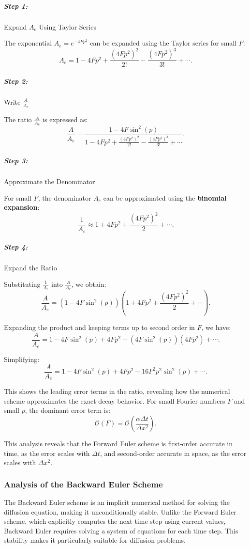 \documentclass{article}
\begin{document}
			\subparagraph{Step 1:} Expand \( A_e \) Using Taylor Series
			
			The exponential \( A_e = e^{-4Fp^2} \) can be expanded using the Taylor series for small \( F \):
			\[
			A_e = 1 - 4Fp^2 + \frac{(4Fp^2)^2}{2!} - \frac{(4Fp^2)^3}{3!} + \cdots.
			\]
			
			\subparagraph{Step 2:} Write \( \frac{A}{A_e} \)
			
			The ratio \( \frac{A}{A_e} \) is expressed as:
			\[
			\frac{A}{A_e} = \frac{1 - 4F\sin^2(p)}{1 - 4Fp^2 + \frac{(4Fp^2)^2}{2!} - \frac{(4Fp^2)^3}{3!} + \cdots}.
			\]
			
			\subparagraph{Step 3:} Approximate the Denominator
			
			For small \( F \), the denominator \( A_e \) can be approximated using the \textbf{binomial expansion}:
			\[
			\frac{1}{A_e} \approx 1 + 4Fp^2 + \frac{(4Fp^2)^2}{2} + \cdots.
			\]
			
			\subparagraph{Step 4:} Expand the Ratio
					     
			Substituting \( \frac{1}{A_e} \) into \( \frac{A}{A_e} \), we obtain:
			\[
			\frac{A}{A_e} = (1 - 4F\sin^2(p)) \left( 1 + 4Fp^2 + \frac{(4Fp^2)^2}{2} + \cdots \right).
			\]
			
			Expanding the product and keeping terms up to second order in \( F \), we have:
			\[
			\frac{A}{A_e} = 1 - 4F\sin^2(p) + 4Fp^2 - (4F\sin^2(p))(4Fp^2) + \cdots.
			\]
			
			Simplifying:
			\[
			\frac{A}{A_e} = 1 - 4F\sin^2(p) + 4Fp^2 - 16F^2p^2\sin^2(p) + \cdots.
			\]
			
			This shows the leading error terms in the ratio, revealing how the numerical scheme approximates the exact decay behavior. 		
			For small Fourier numbers \( F \) and small \( p \), the dominant error term is:
			\[
			\mathcal{O}(F) = \mathcal{O}\left(\frac{\alpha \Delta t}{\Delta x^2}\right).
			\]
			
			This analysis reveals that the Forward Euler scheme is first-order accurate in time, as the error scales with \( \Delta t \), and second-order accurate in space, as the error scales with \( \Delta x^2 \).
		
		\subsubsection{Analysis of the Backward Euler Scheme}
		
			The Backward Euler scheme is an implicit numerical method for solving the diffusion equation, making it unconditionally stable. Unlike the Forward Euler scheme, which explicitly computes the next time step using current values, Backward Euler requires solving a system of equations for each time step. This stability makes it particularly suitable for diffusion problems.
						
\end{document}
